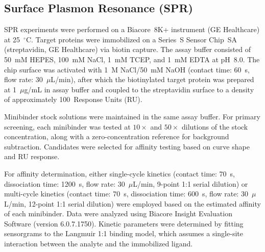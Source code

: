 \documentclass[]{bytedance_seed}
\begin{document}
\subsection{Surface Plasmon Resonance (SPR)}
\label{app:spr}

SPR experiments were performed on a Biacore~8K+ instrument (GE Healthcare) at 25~$^\circ$C. Target proteins were immobilized on a Series~S Sensor Chip~SA (streptavidin, GE Healthcare) via biotin capture. The assay buffer consisted of 50~mM HEPES, 100~mM NaCl, 1~mM TCEP, and 1~mM EDTA at pH~8.0. The chip surface was activated with 1~M NaCl/50~mM NaOH (contact time: 60~s, flow rate: 30~$\mu$L/min), after which the biotinylated target protein was prepared at 1~$\mu$g/mL in assay buffer and coupled to the streptavidin surface to a density of approximately 100~Response Units (RU).

Minibinder stock solutions were maintained in the same assay buffer. For primary screening, each minibinder was tested at $10\times$ and $50\times$ dilutions of the stock concentration, along with a zero-concentration reference for background subtraction. Candidates were selected for affinity testing based on curve shape and RU response.

For affinity determination, either single-cycle kinetics (contact time: 70~s, dissociation time: 1200~s, flow rate: 30~$\mu$L/min, 9-point 1:1 serial dilution) or multi-cycle kinetics (contact time: 70~s, dissociation time: 600~s, flow rate: 30~$\mu$L/min, 12-point 1:1 serial dilution) were employed based on the estimated affinity of each minibinder. Data were analyzed using Biacore Insight Evaluation Software (version 6.0.7.1750). Kinetic parameters were determined by fitting sensorgrams to the Langmuir 1:1 binding model, which assumes a single-site interaction between the analyte and the immobilized ligand.


\end{document}
